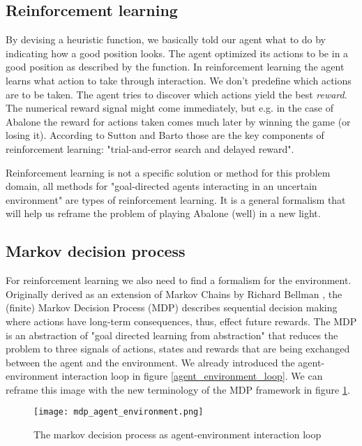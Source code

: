 \subsection{Reinforcement learning}
By devising a heuristic function, we basically told our agent what to do by indicating how a good position looks. The agent optimized its actions to be in a good position as described by the function. In reinforcement learning the agent learns what action to take through interaction. We don't predefine which actions are to be taken. The agent tries to discover which actions yield the best \textit{reward}. The numerical reward signal might come immediately, but e.g. in the case of Abalone the reward for actions taken comes much later by winning the game (or losing it). According to Sutton and Barto those are the key components of reinforcement learning: "trial-and-error search and delayed reward". \cite{sutton_reinforcement_2018}

Reinforcement learning is not a specific solution or method for this problem domain, all methods for "goal-directed agents interacting in an uncertain environment" are types of reinforcement learning. It is a general formalism that will help us reframe the problem of playing Abalone (well) in a new light.

\subsection{Markov decision process}
For reinforcement learning we also need to find a formalism for the environment. Originally derived as an extension of Markov Chains by Richard Bellman \cite{yang_markov_2019, bellman_markovian_1957}, the (finite) Markov Decision Process (MDP) describes sequential decision making where actions have long-term consequences, thus, effect future rewards. The MDP is an abstraction of "goal directed learning from abstraction" that reduces the problem to three signals of actions, states and rewards that are being exchanged between the agent and the environment. We already introduced the agent-environment interaction loop in figure \ref{agent_environment_loop}. We can reframe this image with the new terminology of the MDP framework in figure \ref{mdp_agent_environment}.

\begin{figure}
    \centering
    \texttt{[image: mdp\_agent\_environment.png]}
    \caption{The markov decision process as agent-environment interaction loop}
    \label{mdp_agent_environment}
\end{figure}

